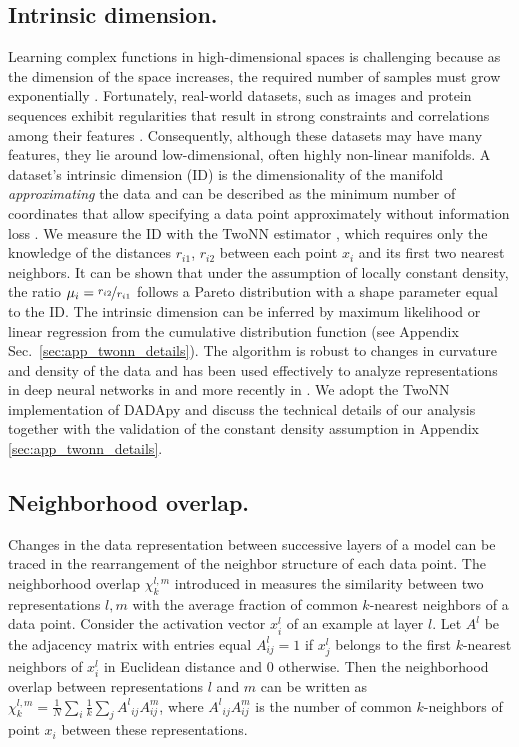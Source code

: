\documentclass{article}
\begin{document}
\subsection{Intrinsic dimension.}
Learning complex functions in high-dimensional spaces is challenging because as the dimension of the space increases, the required number of samples must grow exponentially \cite{narayanan2010sample}. 
%
Fortunately, real-world datasets, such as images
and protein sequences exhibit regularities that result in strong constraints and correlations among their features \cite{teenbaum2000global, granata2016accurate}. 
%
%
Consequently, although these datasets may have many features, they lie around low-dimensional, often highly non-linear manifolds.
%
A dataset's intrinsic dimension (ID) is the dimensionality of the manifold \emph{approximating} the data and can be described as the minimum number of coordinates that allow specifying a data point approximately without information loss \citep{bennet_id, facco2017id}.
%
We measure the ID with the TwoNN estimator \cite{facco2017id}, which requires only the knowledge of the distances $r_{i1}$, $r_{i2}$ between each point $x_i$ and its first two nearest neighbors. It can be shown that under the assumption of locally constant density, the ratio $\mu_i=\nicefrac{r_{i2}}{r_{i1}}$ follows a Pareto distribution with a shape parameter equal to the ID. The intrinsic dimension can be inferred by maximum likelihood or linear regression from the cumulative distribution function (see Appendix Sec.~\ref{sec:app_twonn_details}).
%
The algorithm is robust to changes in curvature and density of the data and has been used effectively to analyze representations in deep neural networks in \cite{ansuini2019intrinsic, doimo2020hierarchical} and more recently in \cite{cheng2023bridging, basile2023relating, kvinge2023exploring}. 
%
We adopt the TwoNN implementation of DADApy \cite{dadapy} and discuss the technical details of our analysis together with the validation of the constant density assumption in Appendix 
\ref{sec:app_twonn_details}.

\subsection{Neighborhood overlap.}\label{subsub:method_no}
%
Changes in the data representation between successive layers of a model can be traced in the rearrangement of the neighbor structure of each data point.
%
The neighborhood overlap $\chi_k^{l,m}$ introduced in \cite{doimo2020hierarchical} measures the similarity between two representations $l, m$ with the average fraction of common $k$-nearest neighbors of a data point.
%
Consider the activation vector $x_i^l$ of an example at layer $l$. Let $A^l$ be the adjacency matrix with entries equal $A^l_{{ij}} =1$  if $x_j^l$ belongs to the first $k$-nearest neighbors of $x_i^l$ in Euclidean distance and $0$ otherwise.
%
Then the neighborhood overlap between representations $l$ and $m$ can be written as $\chi_k^{l,m} = \frac{1}{N} \sum_i \frac{1}{k} \sum_j {A^l}_{ij} A^{m}_{ij}$, where ${A^l}_{ij} A^m_{ij}$ is the number of common $k$-neighbors of point $x_i$ between these representations.
%
%
\end{document}
